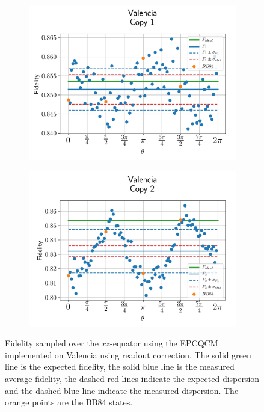 \begin{figure}[H]
  \centering
  \begin{subfigure}{.5\textwidth}
    \centering
    \includegraphics[width=\textwidth]{Figures/Economical/IBM/OnlyEquator/results_corrected_valencia_copy1.png}
    \label{fig:epc_corrected_valencia_equator_1}
  \end{subfigure}%
  \begin{subfigure}{.5\textwidth}
    \centering
    \includegraphics[width=\textwidth]{Figures/Economical/IBM/OnlyEquator/results_corrected_valencia_copy2.png}
    \label{fig:epc_corrected_valencia_equator_2}
  \end{subfigure}
  \vspace{-0.5cm}
  \caption{Fidelity sampled over the $xz$-equator using the EPCQCM implemented on Valencia using readout correction. The solid green line is the expected fidelity, the solid blue line is the measured average fidelity, the dashed red lines indicate the expected dispersion and the dashed blue line indicate the measured dispersion. The orange points are the BB84 states.}
  \label{fig:epc_corrected_valencia_equator}
\end{figure}

